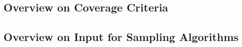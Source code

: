 \subsection{Overview on Coverage Criteria}

\subsection{Overview on Input for Sampling Algorithms}

%

\lessonslearned{
	\item \ldots
}{
	\item \ldots
}{
	\ldots
}





